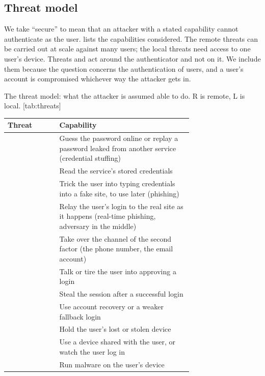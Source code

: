 \subsection{Threat model}\label{sec:threats}

We take \enquote{secure} to mean that an attacker with a stated
capability cannot authenticate as the user.
 lists the capabilities considered.
The remote threats can be carried out at scale against many users; the
local threats need access to one user's device.
Threats  and  act around the authenticator and not
on it.
We include them because the question concerns the authentication of
users, and a user's account is compromised whichever way the attacker
gets in.
\begin{table}
  \begin{sidecaption}{%
    The threat model: what the attacker is assumed able to do.
    R is remote, L is local.
  }[tab:threats]
    \begin{tabular}{@{}lL{0.72\linewidth}@{}}
      \toprule
      Threat & Capability \\
      \midrule
       & Guess the password online or replay a password leaked
        from another service (credential stuffing) \\
       & Read the service's stored credentials \\
       & Trick the user into typing credentials into a fake
        site, to use later (phishing) \\
       & Relay the user's login to the real site as it happens
        (real-time phishing, adversary in the middle) \\
       & Take over the channel of the second factor (the phone
        number, the email account) \\
       & Talk or tire the user into approving a login \\
       & Steal the session after a successful login \\
       & Use account recovery or a weaker fallback login \\
      \midrule
       & Hold the user's lost or stolen device \\
       & Use a device shared with the user, or watch the user
        log in \\
       & Run malware on the user's device \\
      \bottomrule
    \end{tabular}
  \end{sidecaption}
\end{table}

